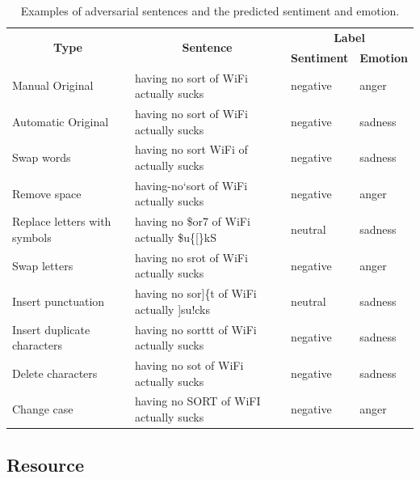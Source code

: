 \documentclass[11pt,a4paper]{article}
\begin{document}
\begin{table}[ht]
\centering
\begin{tabular}{llll}
\hline
\multicolumn{1}{c}{\multirow{2}{*}{\textbf{Type}}} & \multicolumn{1}{c}{\multirow{2}{*}{\textbf{Sentence}}} & \multicolumn{2}{c}{\textbf{Label}} \\ \cline{3-4} 
\multicolumn{1}{c}{} & \multicolumn{1}{c}{} & \multicolumn{1}{c}{\textbf{Sentiment}} & \multicolumn{1}{c}{\textbf{Emotion}} \\ \hline
Manual Original & having no sort of WiFi actually sucks & negative & anger \\
Automatic Original & having no sort of WiFi actually sucks & negative & sadness \\
Swap words & having no sort WiFi of actually sucks & negative & sadness \\
Remove space & having-no`sort of WiFi actually sucks & negative & anger \\
Replace letters with symbols & having no \$or7 of WiFi actually \$u\{[\}kS & neutral & sadness \\
Swap letters & having no srot of WiFi actually sucks & negative & anger \\
Insert punctuation & having no sor{]}\{t of WiFi actually {]}su!cks & neutral & sadness \\
Insert duplicate characters & having no sorttt of WiFi actually sucks & negative & sadness \\
Delete characters & having no sot of WiFi actually sucks & negative & sadness \\
Change case & having no SORT of WiFI actually sucks & negative & anger \\ \hline
\end{tabular}
\caption{Examples of adversarial sentences and the predicted sentiment and emotion.}
\label{tab:adversarial}
\end{table}

\subsection{Resource}
\end{document}
